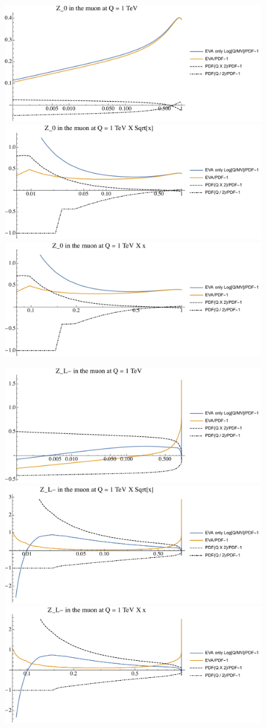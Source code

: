 \documentclass[a4paper,11pt]{article}
\begin{document}
\begin{figure}[ht]
\includegraphics[width=0.46\linewidth]{PlotPDFs/ratios/1TeV/Z_0_Q.pdf}
\includegraphics[width=0.46\linewidth]{PlotPDFs/ratios/1TeV/Z_0_Qsqrtx.pdf}
\includegraphics[width=0.46\linewidth]{PlotPDFs/ratios/1TeV/Z_0_Qx.pdf}
\end{figure}

\begin{figure}[ht]
\includegraphics[width=0.46\linewidth]{PlotPDFs/ratios/1TeV/Z_L-_Q.pdf}
\includegraphics[width=0.46\linewidth]{PlotPDFs/ratios/1TeV/Z_L-_Qsqrtx.pdf}
\includegraphics[width=0.46\linewidth]{PlotPDFs/ratios/1TeV/Z_L-_Qx.pdf}
\end{figure}
\end{document}
